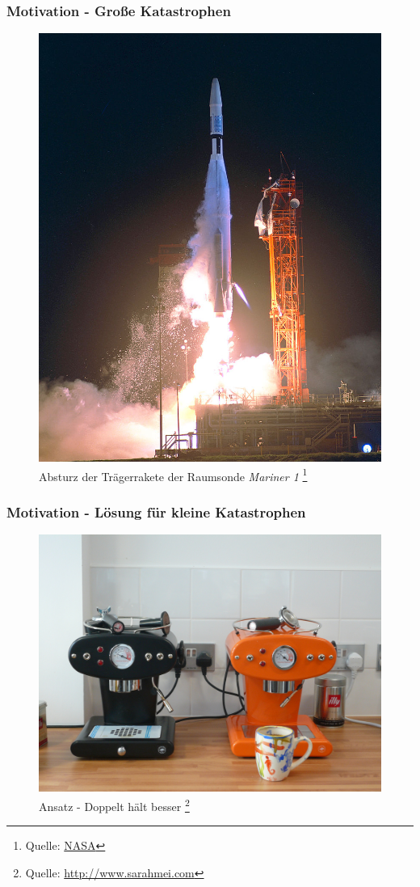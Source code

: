 \begin{frame}
		\frametitle{Motivation - Große Katastrophen}
		\begin{figure}
			\includegraphics[scale=0.7]{grafiken/mariner}		
			\caption{Absturz der Trägerrakete der Raumsonde \emph{Mariner 1}
				\footnote{\tiny Quelle: \url{NASA} }
			}		
		\end{figure}
\end{frame}%
%
%
\begin{frame}
	\frametitle{Motivation - Lösung für kleine Katastrophen}
	\begin{figure}
		\includegraphics[scale=0.2]{grafiken/working}		
		\caption{Ansatz - Doppelt hält besser
			\footnote{\tiny Quelle: \url{http://www.sarahmei.com} }
		}		
	\end{figure}
\end{frame}
%
%

